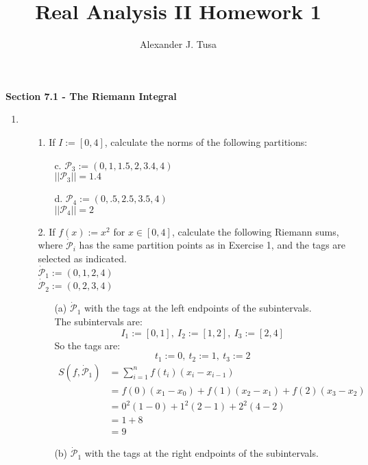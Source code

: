 \documentclass[12pt,letterpaper]{article}
\author{Alexander J. Tusa}
\title{Real Analysis II Homework 1}
\newcommand{\dotp}{\dot{\mathcal{P}}}
\theoremstyle{case}
\theoremstyle{definition}
\begin{document}
	\maketitle
	\textbf{Section 7.1 - The Riemann Integral}
	\begin{enumerate}
		\item 
		\begin{enumerate}
			\item[1.] If $I:=[0,4]$, calculate the norms of the following partitions:
			\begin{enumerate}
				\item[c.] $\mathcal{P}_3 := (0,1,1.5,2,3.4,4)$
				\\$||\mathcal{P}_3||=1.4$
				\item[d.] $\mathcal{P}_4 := (0,.5,2.5,3.5,4)$
				\\$||\mathcal{P}_4||=2$
			\end{enumerate}
			\item[2.] If $f(x):=x^2$ for $x \in [0,4]$, calculate the following Riemann sums, where $\dotp_i$ has the same partition points as in Exercise 1, and the tags are selected as indicated.
			\\$\dotp_1 := (0,1,2,4)$
			\\$\dotp_2 := (0,2,3,4)$
			\begin{enumerate}
				\item[(a)] $\dotp_1$ with the tags at the left endpoints of the subintervals.
				\\The subintervals are:
				\[I_1:=[0,1],\ I_2:=[1,2],\ I_3:=[2,4]\]
				So the tags are:
				\[t_1:=0,\ t_2:=1,\ t_3:=2\]
				\begin{align*}
					S(f,\dotp_1) &= \sum_{i=1}^{n} f(t_i)(x_i-x_{i-1}) \\
					&= f(0)(x_1-x_0)+f(1)(x_2-x_1)+f(2)(x_3-x_2) \\
					&= 0^2(1-0)+1^2(2-1)+2^2(4-2) \\
					&= 1+8 \\
					&= 9
				\end{align*}
				\item[(b)] $\dotp_1$ with the tags at the right endpoints of the subintervals.

\end{enumerate}
\end{enumerate}
\end{enumerate}
\end{document}
